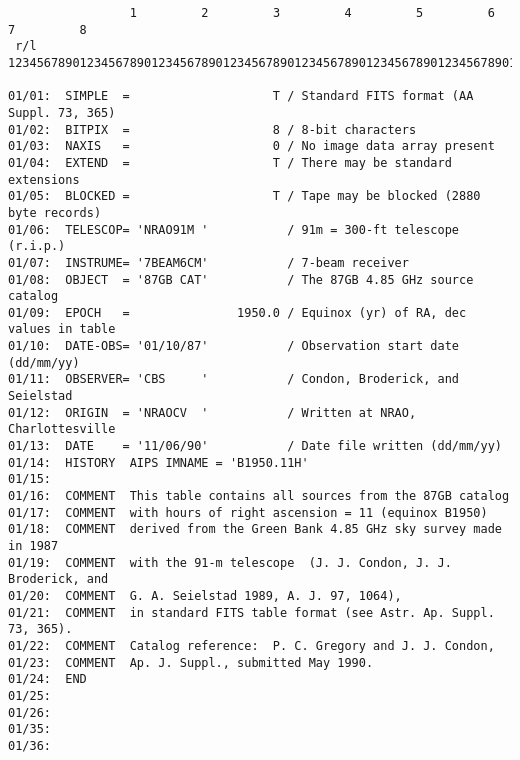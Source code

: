 \pagebreak
{\footnotesize \begin{verbatim}
                 1         2         3         4         5         6         7         8
 r/l    12345678901234567890123456789012345678901234567890123456789012345678901234567890

01/01:  SIMPLE  =                    T / Standard FITS format (AA Suppl. 73, 365)       
01/02:  BITPIX  =                    8 / 8-bit characters                               
01/03:  NAXIS   =                    0 / No image data array present                    
01/04:  EXTEND  =                    T / There may be standard extensions               
01/05:  BLOCKED =                    T / Tape may be blocked (2880 byte records)        
01/06:  TELESCOP= 'NRAO91M '           / 91m = 300-ft telescope (r.i.p.)                
01/07:  INSTRUME= '7BEAM6CM'           / 7-beam receiver                                
01/08:  OBJECT  = '87GB CAT'           / The 87GB 4.85 GHz source catalog               
01/09:  EPOCH   =               1950.0 / Equinox (yr) of RA, dec values in table        
01/10:  DATE-OBS= '01/10/87'           / Observation start date (dd/mm/yy)              
01/11:  OBSERVER= 'CBS     '           / Condon, Broderick, and Seielstad               
01/12:  ORIGIN  = 'NRAOCV  '           / Written at NRAO, Charlottesville               
01/13:  DATE    = '11/06/90'           / Date file written (dd/mm/yy)                   
01/14:  HISTORY  AIPS IMNAME = 'B1950.11H'                                              
01/15:                                                                                  
01/16:  COMMENT  This table contains all sources from the 87GB catalog                  
01/17:  COMMENT  with hours of right ascension = 11 (equinox B1950)                     
01/18:  COMMENT  derived from the Green Bank 4.85 GHz sky survey made in 1987           
01/19:  COMMENT  with the 91-m telescope  (J. J. Condon, J. J. Broderick, and           
01/20:  COMMENT  G. A. Seielstad 1989, A. J. 97, 1064),                                 
01/21:  COMMENT  in standard FITS table format (see Astr. Ap. Suppl. 73, 365).          
01/22:  COMMENT  Catalog reference:  P. C. Gregory and J. J. Condon,                    
01/23:  COMMENT  Ap. J. Suppl., submitted May 1990.                                     
01/24:  END                                                                             
01/25:                                                                                  
01/26:                                                                                  
01/35:                                                                                  
01/36:                                                                                  
\end{verbatim} }

